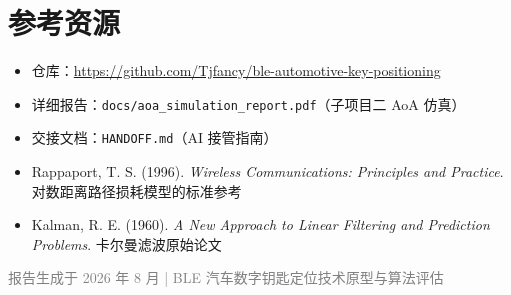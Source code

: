 \documentclass[11pt,a4paper]{article}
\newcommand{\code}[1]{\texttt{#1}}
\begin{document}
\section*{参考资源}
\begin{itemize}
    \item 仓库：\url{https://github.com/Tjfancy/ble-automotive-key-positioning}
    \item 详细报告：\code{docs/aoa\_simulation\_report.pdf}（子项目二 AoA 仿真）
    \item 交接文档：\code{HANDOFF.md}（AI 接管指南）
    \item Rappaport, T. S. (1996). \emph{Wireless Communications: Principles and Practice}. 对数距离路径损耗模型的标准参考
    \item Kalman, R. E. (1960). \emph{A New Approach to Linear Filtering and Prediction Problems}. 卡尔曼滤波原始论文
\end{itemize}

\vfill
\begin{center}
\small \textcolor{gray}{报告生成于 2026 年 8 月 | BLE 汽车数字钥匙定位技术原型与算法评估}
\end{center}
\end{document}
